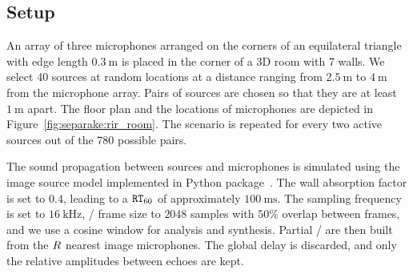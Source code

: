 \subsection{Setup}
An array of three microphones arranged on the corners of an equilateral triangle with edge length $\SI{0.3}{\m}$ is placed in the corner of a 3D room with 7 walls.
We select 40 sources at random locations at a distance ranging from $\SI{2.5}{\m}$ to $\SI{4}{\m}$ from the microphone array.
Pairs of sources are chosen so that they are at least $\SI{1}{\m}$ apart.
The floor plan and the locations of microphones are depicted in Figure~\ref{fig:separake:rir_room}.
The scenario is repeated for every two active sources out of the 780 possible pairs.

\mynewline
The sound propagation between sources and microphones is simulated using the
image source model implemented in  Python package~.
The wall absorption factor is set to $0.4$, leading to a $\mathtt{RT}_{60}$ of approximately $\SI{100}{\ms}$.
The sampling frequency is set to $\SI{16}{\kHz}$, \STFT/ frame size to $2048$ samples with $50\%$ overlap between frames, and we use a cosine window for analysis and synthesis.
Partial \RTFs/ are then built from the $R$ nearest image microphones.
The global delay is discarded, and only the relative amplitudes between echoes are kept.

